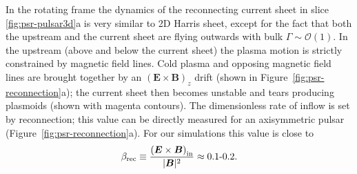 In the rotating frame the dynamics of the reconnecting current sheet in slice \ref{fig:psr-pulsar3d}a is very similar to 2D Harris sheet, except for the fact that both the upstream and the current sheet are flying outwards with bulk $\Gamma\sim \mathcal{O}(1)$. In the upstream (above and below the current sheet) the plasma motion is strictly constrained by magnetic field lines. Cold plasma and opposing magnetic field lines are brought together by an $\left(\bm{E}\times\bm{B}\right)_z$ drift (shown in Figure~\ref{fig:psr-reconnection}a); the current sheet then becomes unstable and tears producing plasmoids (shown with magenta contours). The dimensionless rate of inflow is set by reconnection; this value can be directly measured for an axisymmetric pulsar (Figure~\ref{fig:psr-reconnection}a). For our simulations this value is close to
\begin{equation}
    \beta_{\rm rec} \equiv \frac{\left(\bm{E}\times\bm{B}\right)_{\rm in}}{|\bm{B}|^2} \approx 0.1\text{-}0.2.
\end{equation}

\begin{figure}[htb]
\end{figure}

